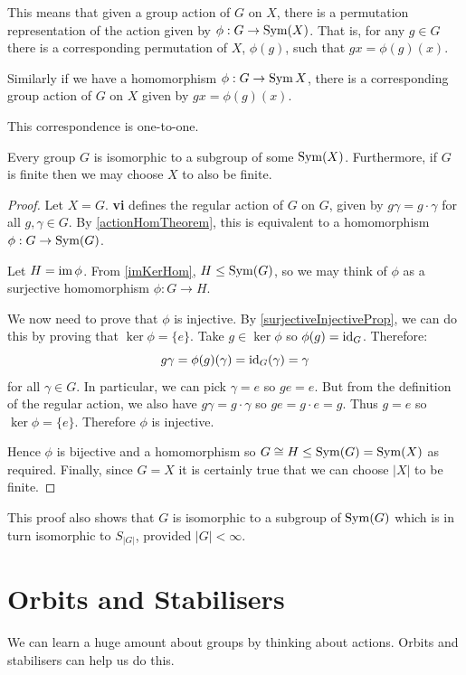 \documentclass[../main.tex]{subfiles}
\begin{document}
\begin{remark}[Intuition]
  This means that given a group action of $G$ on $X$, there is a permutation representation of the action given by $\phi: G \to \operatorname{Sym}(X)$.
  That is, for any $g \in G$ there is a corresponding permutation of $X$, $\phi(g)$, such that $gx = \phi(g)(x)$.

  Similarly if we have a homomorphism $\phi: G \to \operatorname{Sym} X$, there is a corresponding group action of $G$ on $X$ given by $gx = \phi(g)(x)$.

  This correspondence is one-to-one.
\end{remark}
\begin{theorem}
  Every group $G$ is isomorphic to a subgroup of some $\operatorname{Sym}(X)$.
  Furthermore, if $G$ is finite then we may choose $X$ to also be finite.
\end{theorem}
\begin{proof}
  Let $X = G$.
   \textbf{vi} defines the regular action  of $G$ on $G$, given by $g\gamma = g \cdot \gamma$ for all $g, \gamma \in G$.
  By \cref{actionHomTheorem}, this is equivalent to a homomorphism $\phi: G \to \operatorname{Sym}(G)$.

  Let $H = \operatorname{im} \phi$.
  From \cref{imKerHom}, $H \leq \operatorname{Sym} (G)$, so we may think of $\phi$ as a surjective homomorphism $\phi: G \to H$.

  We now need to prove that $\phi$ is injective.
  By \cref{surjectiveInjectiveProp}, we can do this by proving that $\ker \phi  = \{e\}$.
  Take $g \in \ker \phi$ so $\phi(g) = \mathrm{id}_G$.
  Therefore:
  \[
    g \gamma = \phi(g)(\gamma) = \mathrm{id}_G(\gamma) = \gamma
  \]
  for all $\gamma \in G$.
  In particular, we can pick $\gamma = e$ so $ge = e$.
  But from the definition of the regular action, we also have $g\gamma = g \cdot \gamma$ so $ge = g \cdot e = g$.
  Thus $g = e$ so $\ker \phi = \{e\}$.
  Therefore $\phi$ is injective.

  Hence $\phi$ is bijective and a homomorphism so $G \cong H \leq \operatorname{Sym}(G) = \operatorname{Sym}(X)$  as required.
  Finally, since $G = X$ it is certainly true that we can choose $|X|$ to be finite.
\end{proof}
\begin{remark}[Note]
  This proof also shows that $G$ is isomorphic to a subgroup of $\operatorname{Sym}(G)$ which is in turn isomorphic to $S_{|G|}$, provided $|G| < \infty$.
\end{remark}
\section{Orbits and Stabilisers}
We can learn a huge amount about groups by thinking about actions.
Orbits and stabilisers can help us do this.
\end{document}

